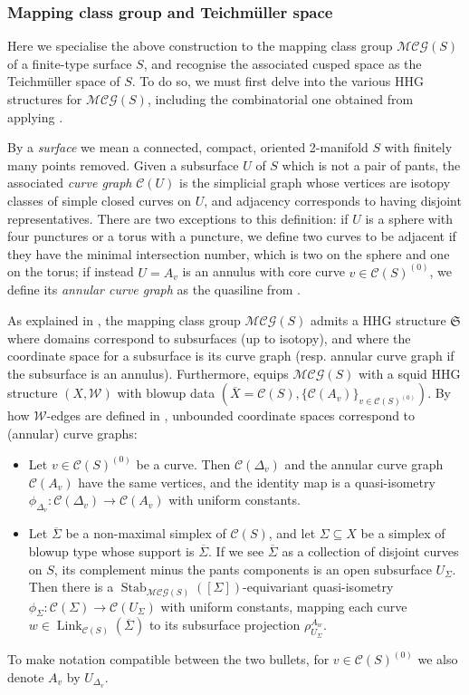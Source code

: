 \documentclass[svgnames]{amsart}
\theoremstyle{plain}
\theoremstyle{definition}
\newcommand{\frakS}{\mathfrak S}
\newcommand{\C}[1]{\mathcal{C}(#1)}
\newcommand{\link}[2]{\operatorname{Link}_{#1}\left(#2\right)}
\newcommand{\W}{\mathcal{W}}
\newcommand{\squid}[1]{squid}
\newcommand{\MCG}{\mathcal{MCG}}
\newcommand{\Stab}[2]{\operatorname{Stab}_{#1}\left(#2\right)}
\newcommand{\ov}[1]{\overline{#1}}
\begin{document}
    



\subsubsection{Mapping class group and Teichm\"{u}ller space} Here we specialise the above construction to the mapping class group $\MCG(S)$ of a finite-type surface $S$, and recognise the associated cusped space as the Teichm\"{u}ller space of $S$. To do so, we must first delve into the various HHG structures for $\MCG(S)$, including the combinatorial one obtained from applying \cite[Theorem 3.15]{converse}.

By a \emph{surface} we mean a connected, compact, oriented 2-manifold $S$ with finitely many points removed. Given a subsurface $U$ of $S$ which is not a pair of pants, the associated \emph{curve graph} $\C U$ is the simplicial graph whose vertices are isotopy classes of simple closed curves on $U$, and adjacency corresponds to having disjoint representatives. There are two exceptions to this definition: if $U$ is a sphere with four punctures or a torus with a puncture, we define two curves to be adjacent if they have the minimal intersection number, which is two on the sphere and one on the torus; if instead $U=A_v$ is an annulus with core curve $v\in \C{S}^{(0)}$, we define its \emph{annular curve graph} as the quasiline from \cite[Section 2.4]{Masur_Minsky_2}. 
 

As explained in \cite[Theorem G]{HHS_I}, the mapping class group $\MCG(S)$ admits a HHG structure $\frakS$ where domains correspond to subsurfaces (up to isotopy), and where the coordinate space for a subsurface is its curve graph (resp. annular curve graph if the subsurface is an annulus). Furthermore, \cite[Theorem 9.8]{converse} equips $\MCG(S)$ with a \squid{} HHG structure $(X,\W)$ with blowup data $(\ov X=\C S, \{\C{A_v}\}_{v\in \C S^{(0)}})$. By how $\W$-edges are defined in \cite[Definition 4.10]{converse}, unbounded coordinate spaces correspond to (annular) curve graphs: 
\begin{itemize}
    \item Let $v\in \C S^{(0)}$ be a curve. Then $\C{\Delta_v}$ and the annular curve graph $\C{A_v}$ have the same vertices, and the identity map is a quasi-isometry $\phi_{\Delta_v}\colon \C{\Delta_v}\to \C{A_v}$ with uniform constants. 
    \item Let $\ov \Sigma$ be a non-maximal simplex of $\C S$, and let $\Sigma\subseteq X$ be a simplex of blowup type whose support is $\ov \Sigma$. If we see $\ov\Sigma$ as a collection of disjoint curves on $S$, its complement minus the pants components is an open subsurface $U_\Sigma$. Then there is a $\Stab{\MCG(S)}{[\Sigma]}$-equivariant quasi-isometry $\phi_{\Sigma}\colon \C{\Sigma}\to \C{U_\Sigma}$ with uniform constants, mapping each curve $w\in \link{\C S}{\ov \Sigma}$ to its subsurface projection $\rho^{A_w}_{U_\Sigma}$. 
\end{itemize}
To make notation compatible between the two bullets, for $v\in \C S^{(0)}$ we also denote $A_v$ by $U_{\Delta_v}$.
\end{document}
